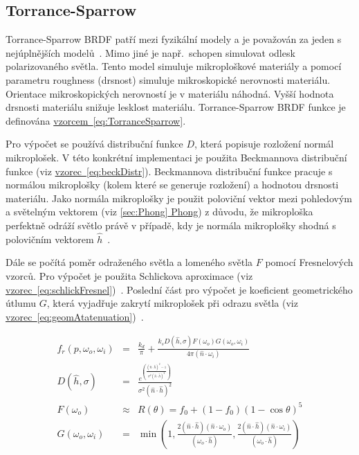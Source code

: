 \documentclass[czech,master]{diploma}
\newcommand{\uvec}[1]{\hat{#1}}
\newcommand{\point}{p}
\newcommand{\brdf}{f_r\left(\point,\omega_{o},\omega_{i}\right)}
\newcommand{\normVec}{\uvec{n}}
\newcommand{\inVec}{\omega_{i}}
\newcommand{\outVec}{\omega_{o}}
\newcommand{\halfVec}{\uvec{h}}
\newcommand{\rough}{\sigma}
\newcommand{\ior}{f_0}
\begin{document}
\subsection{Torrance-Sparrow} \label{sec:torrancesparrow}
Torrance-Sparrow BRDF patří mezi fyzikální modely a je považován za jeden s nejúplnějších modelů~\cite{BRDFOverview}. Mimo jiné je např.\ schopen simulovat odlesk polarizovaného světla. Tento model simuluje mikroploškové materiály a pomocí parametru roughness (drsnost) simuluje mikroskopické nerovnosti materiálu. Orientace mikroskopických nerovností je v materiálu náhodná. Vyšší hodnota drsnosti materiálu snižuje lesklost materiálu. Torrance-Sparrow BRDF funkce je definována \hyperref[eq:TorranceSparrow]{vzorcem~\ref{eq:TorranceSparrow}}. \par
Pro výpočet se používá distribuční funkce \(D\), která popisuje rozložení normál mikroplošek. V této konkrétní implementaci je použita Beckmannova distribuční funkce (viz \hyperref[eq:beckDistr]{vzorec~\ref{eq:beckDistr}}). Beckmannova distribuční funkce pracuje s normálou mikroplošky (kolem které se generuje rozložení) a hodnotou drsnosti materiálu. Jako normála mikroplošky je použit poloviční vektor mezi pohledovým a světelným vektorem (viz \hyperref[sec:Phong]{\ref{sec:Phong} Phong}) z důvodu, že mikroploška perfektně odráží světlo právě v případě, kdy je normála mikroplošky shodná s polovičním vektorem \(\halfVec\)~\cite{PHARR2017507}. \par
Dále se počítá poměr odraženého světla a lomeného světla \(F\) pomocí Fresnelových vzorců. Pro výpočet je použita Schlickova aproximace (viz \hyperref[eq:schlickFresnel]{vzorec~\ref{eq:schlickFresnel}})~\cite{SchlickFresnel}. Poslední část pro výpočet je koeficient geometrického útlumu \(G\), která vyjadřuje zakrytí mikroplošek při odrazu světla (viz \hyperref[eq:geomAtatenuation]{vzorec~\ref{eq:geomAtatenuation}})~\cite{BRDFOverview}.


\begin{eqnarray}
  \brdf & = & \frac{k_d}{\pi} + \frac{k_s D(\halfVec,\rough) F(\outVec) G(\outVec,\inVec)}{4\pi (\normVec \cdot \inVec)}\label{eq:TorranceSparrow}\\
  D(\halfVec,\rough) & = & \frac{e^{\left(\frac{(\normVec\cdot \halfVec)^{2}-1}{\rough^{2}(\normVec \cdot \halfVec)^{2}}\right)}}{\rough^2(\normVec\cdot \halfVec)^{2}}\label{eq:beckDistr}\\
  F(\outVec) & \approx & R(\theta) = \ior + {(1-\ior)}{(1-\cos\theta)}^{5}\label{eq:schlickFresnel}\\
  G(\outVec,\inVec) & = & \min \left( 1, \frac{2 ( \normVec \cdot \halfVec ) ( \normVec \cdot \outVec )
    }{ ( \outVec \cdot \halfVec ) },\frac{ 2 ( \normVec \cdot \halfVec ) ( \normVec \cdot \inVec ) }{ ( \outVec \cdot \halfVec ) } \right) \label{eq:geomAtatenuation}
\end{eqnarray}
\end{document}
